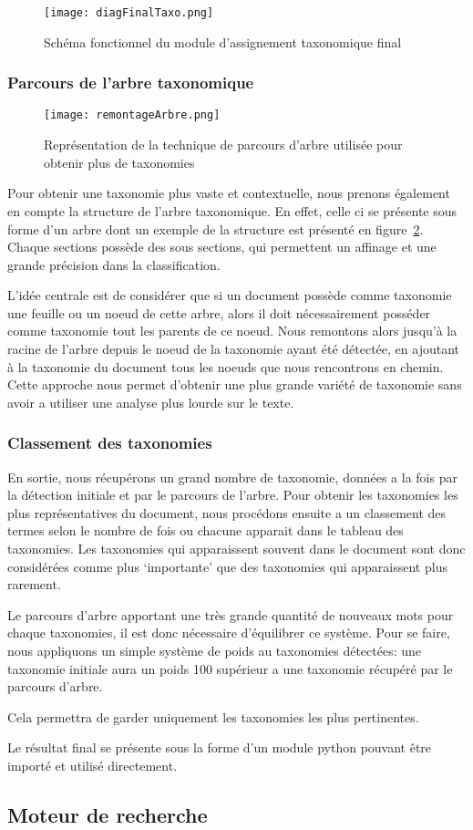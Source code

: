 \begin{figure}[h!]
  \centering
  \texttt{[image: diagFinalTaxo.png]}
	\caption[]{Schéma fonctionnel du module d'assignement taxonomique final}
	\label{taxoFinal}
\end{figure}

\subsubsection{Parcours de l'arbre taxonomique}
\begin{figure}[h!]
  \centering
  \texttt{[image: remontageArbre.png]}
	\caption[]{Représentation de la technique de parcours d'arbre utilisée pour obtenir plus de taxonomies}
	\label{fig:tree}
\end{figure}


Pour obtenir une taxonomie plus vaste et contextuelle, nous prenons également en compte la structure de l'arbre taxonomique.
En effet, celle ci se présente sous forme d'un arbre dont un exemple de la structure est présenté en figure~\ref{fig:tree}. 
Chaque sections possède des sous sections, qui permettent un affinage et une grande précision dans la classification.

L'idée centrale est de considérer que si un document possède comme taxonomie une feuille ou un noeud de cette arbre, alors il doit nécessairement posséder comme taxonomie tout les parents de ce noeud. 
Nous remontons alors jusqu'à la racine de l'arbre depuis le noeud de la taxonomie ayant été détectée, en ajoutant à la taxonomie du document tous les noeuds que nous rencontrons en chemin.
Cette approche nous permet d'obtenir une plus grande variété de taxonomie sans avoir a utiliser une analyse plus lourde sur le texte. 


\subsubsection{Classement des taxonomies}
En sortie, nous récupérons un grand nombre de taxonomie, données a la fois par la détection initiale et par le parcours de l'arbre.
Pour obtenir les taxonomies les plus représentatives du document, nous procédons ensuite a un classement des termes selon le nombre de fois ou chacune apparait dans le tableau des taxonomies.
Les taxonomies qui apparaissent souvent dans le document sont donc considérées comme plus `importante' que des taxonomies qui apparaissent plus rarement.

Le parcours d'arbre apportant une très grande quantité de nouveaux mots pour chaque taxonomies, il est donc nécessaire d'équilibrer ce système.
Pour se faire, nous appliquons un simple système de poids au taxonomies détectées: une taxonomie initiale aura un poids 100 supérieur a une taxonomie récupéré par le parcours d'arbre.

Cela permettra de garder uniquement les taxonomies les plus pertinentes.




Le résultat final se présente sous la forme d'un module python pouvant être importé et utilisé directement.



\subsection{Moteur de recherche}


